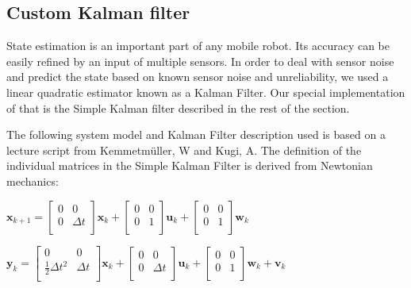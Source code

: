 \documentclass[class=article, crop=false]{standalone}
\begin{document}
\subsection{Custom Kalman filter}\label{subsec:customkalman}
State estimation is an important part of any mobile robot. Its accuracy can be easily refined by an input of multiple sensors. In order to deal with sensor noise and predict the state based on known sensor noise and unreliability, we used a linear quadratic estimator known as a Kalman Filter. Our special implementation of that is the Simple Kalman filter described in the rest of the section.

The following system model and Kalman Filter description used is based on a lecture script from Kemmetm{\"u}ller, W and Kugi, A\cite{regelungssysteme1}. The definition of the individual matrices in the Simple Kalman Filter is derived from Newtonian mechanics:

\vspace{0.5cm}
\hspace{2cm}
$ \textbf{x}_{k+1} =
\begin{bmatrix}
  0 & 0 \\
  0 & \Delta t \\
\end{bmatrix}
\textbf{x}_k +
\begin{bmatrix}
  0 & 0 \\
  0 & 1 \\
\end{bmatrix}
\textbf{u}_k +
\begin{bmatrix}
  0 & 0 \\
  0 & 1 \\
\end{bmatrix}
\textbf{w}_k $

\vspace{0.5cm}
\hspace{2cm}
$ \textbf{y}_k =
\begin{bmatrix}
  0 & 0 \\
  \frac{1}{2} \Delta t^2 & \Delta t \\
\end{bmatrix}
\textbf{x}_k +
\begin{bmatrix}
    0 & 0 \\
    0 & \Delta t \\
\end{bmatrix}
\textbf{u}_k +
\begin{bmatrix}
    0 & 0 \\
    0 & 1 \\
\end{bmatrix}
\textbf{w}_k +
\textbf{v}_k $
\label{eqn:system}
\end{document}
